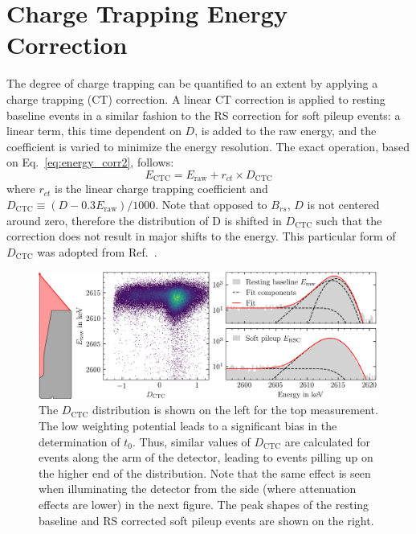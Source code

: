 \section{Charge Trapping Energy Correction}

The degree of charge trapping can be quantified to an extent by applying a charge trapping (CT) correction. A linear CT correction is applied to resting baseline events in a similar fashion to the RS correction for soft pileup events: a linear term, this time dependent on $D$, is added to the raw energy, and the coefficient is varied to minimize the energy resolution. The exact operation, based on Eq.~\ref{eq:energy_corr2}, follows:
\begin{equation}
	E_\text{CTC} = E_\text{raw} + r_{ct} \times D_\text{CTC}
	\label{eq:ct_energy_corr}
\end{equation}
where $r_{ct}$ is the linear charge trapping coefficient and $D_\text{CTC} \equiv (D-0.3E_\text{raw})/1000$. Note that opposed to $B_{rs}$, $D$ is not centered around zero, therefore the distribution of D is shifted in $D_\text{CTC}$ such that the correction does not result in major shifts to the energy. This particular form of $D_\text{CTC}$ was adopted from Ref.~\cite{ornl_analysis}.
\begin{figure}[htb]
    \centering
    \includegraphics[width=6in]{figs/param/dt_e_corr.png}
    \caption{The $D_\text{CTC}$ distribution is shown on the left for the top \ThS{} measurement. The low weighting potential leads to a significant bias in the determination of $t_0$. Thus, similar values of $D_\text{CTC}$ are calculated for events along the arm of the detector, leading to events pilling up on the higher end of the distribution. Note that the same effect is seen when illuminating the detector from the side (where attenuation effects are lower) in the next figure. The peak shapes of the resting baseline and RS corrected soft pileup events are shown on the right.}
    \label{fig:dt_e_corr}
\end{figure}
